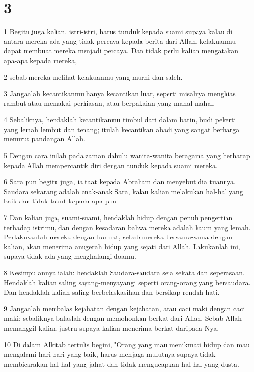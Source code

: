 \chapter{3}

\par 1 Begitu juga kalian, istri-istri, harus tunduk kepada suami supaya kalau di antara mereka ada yang tidak percaya kepada berita dari Allah, kelakuanmu dapat membuat mereka menjadi percaya. Dan tidak perlu kalian mengatakan apa-apa kepada mereka,
\par 2 sebab mereka melihat kelakuanmu yang murni dan saleh.
\par 3 Janganlah kecantikanmu hanya kecantikan luar, seperti misalnya menghias rambut atau memakai perhiasan, atau berpakaian yang mahal-mahal.
\par 4 Sebaliknya, hendaklah kecantikanmu timbul dari dalam batin, budi pekerti yang lemah lembut dan tenang; itulah kecantikan abadi yang sangat berharga menurut pandangan Allah.
\par 5 Dengan cara inilah pada zaman dahulu wanita-wanita beragama yang berharap kepada Allah mempercantik diri dengan tunduk kepada suami mereka.
\par 6 Sara pun begitu juga, ia taat kepada Abraham dan menyebut dia tuannya. Saudara sekarang adalah anak-anak Sara, kalau kalian melakukan hal-hal yang baik dan tidak takut kepada apa pun.
\par 7 Dan kalian juga, suami-suami, hendaklah hidup dengan penuh pengertian terhadap istrimu, dan dengan kesadaran bahwa mereka adalah kaum yang lemah. Perlakukanlah mereka dengan hormat, sebab mereka bersama-sama dengan kalian, akan menerima anugerah hidup yang sejati dari Allah. Lakukanlah ini, supaya tidak ada yang menghalangi doamu.
\par 8 Kesimpulannya ialah: hendaklah Saudara-saudara seia sekata dan seperasaan. Hendaklah kalian saling sayang-menyayangi seperti orang-orang yang bersaudara. Dan hendaklah kalian saling berbelaskasihan dan bersikap rendah hati.
\par 9 Janganlah membalas kejahatan dengan kejahatan, atau caci maki dengan caci maki; sebaliknya balaslah dengan memohonkan berkat dari Allah. Sebab Allah memanggil kalian justru supaya kalian menerima berkat daripada-Nya.
\par 10 Di dalam Alkitab tertulis begini, "Orang yang mau menikmati hidup dan mau mengalami hari-hari yang baik, harus menjaga mulutnya supaya tidak membicarakan hal-hal yang jahat dan tidak mengucapkan hal-hal yang dusta.
